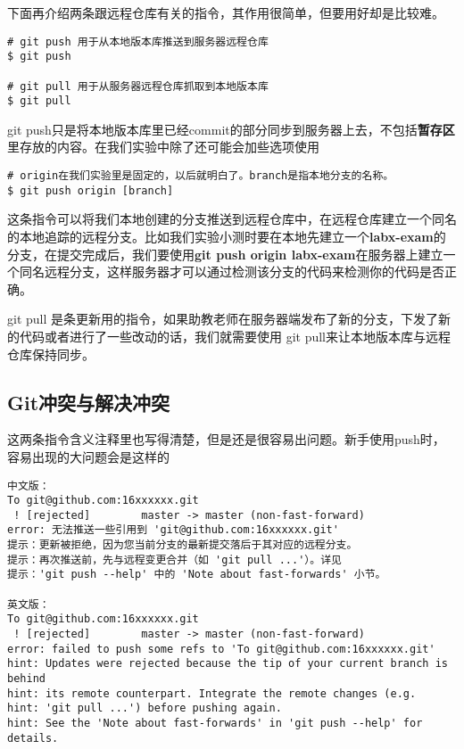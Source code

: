 下面再介绍两条跟远程仓库有关的指令，其作用很简单，但要用好却是比较难。
\begin{verbatim}
# git push 用于从本地版本库推送到服务器远程仓库
$ git push

# git pull 用于从服务器远程仓库抓取到本地版本库
$ git pull
\end{verbatim}
git push只是将本地版本库里已经commit的部分同步到服务器上去，不包括\textbf{暂存区}里存放的内容。在我们实验中除了还可能会加些选项使用

\begin{verbatim}
# origin在我们实验里是固定的，以后就明白了。branch是指本地分支的名称。
$ git push origin [branch]
\end{verbatim}

这条指令可以将我们本地创建的分支推送到远程仓库中，在远程仓库建立一个同名的本地追踪的远程分支。比如我们实验小测时要在本地先建立一个\textbf{labx-exam}的分支，在提交完成后，我们要使用\textbf{git push origin labx-exam}在服务器上建立一个同名远程分支，这样服务器才可以通过检测该分支的代码来检测你的代码是否正确。

git pull\label{更新指令} 是条更新用的指令，如果助教老师在服务器端发布了新的分支，下发了新的代码或者进行了一些改动的话，我们就需要使用 git pull来让本地版本库与远程仓库保持同步。

\subsection{Git冲突与解决冲突}

这两条指令含义注释里也写得清楚，但是还是很容易出问题。新手使用push时，容易出现的大问题会是这样的

\begin{verbatim}
中文版：
To git@github.com:16xxxxxx.git
 ! [rejected]        master -> master (non-fast-forward) 
error: 无法推送一些引用到 'git@github.com:16xxxxxx.git' 
提示：更新被拒绝，因为您当前分支的最新提交落后于其对应的远程分支。 
提示：再次推送前，先与远程变更合并（如 'git pull ...'）。详见 
提示：'git push --help' 中的 'Note about fast-forwards' 小节。

英文版：
To git@github.com:16xxxxxx.git
 ! [rejected]        master -> master (non-fast-forward)
error: failed to push some refs to 'To git@github.com:16xxxxxx.git'
hint: Updates were rejected because the tip of your current branch is behind
hint: its remote counterpart. Integrate the remote changes (e.g.
hint: 'git pull ...') before pushing again.
hint: See the 'Note about fast-forwards' in 'git push --help' for details.
\end{verbatim}

